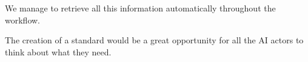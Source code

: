
We manage to retrieve all this information automatically throughout the workflow.

The creation of a standard
would be a great opportunity for all the AI actors to think about what they
need.


%
%
%



